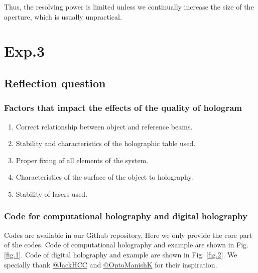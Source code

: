 \documentclass[12pt,a4paper,UTF8]{article}
\begin{document}
        Thus, the resolving power is limited unless we continually increase the size of the aperture, which is usually unpractical.



\section{Exp.3 }
    \subsection{Reflection question}
        \subsubsection{Factors that impact the effects of the quality of hologram}
        \begin{enumerate}[label=\arabic*.]
            \item Correct relationship between object and reference beams.        
            \item Stability and characteristics of the holographic table used.
            \item Proper fixing of all elements of the system.
            \item Characteristics of the surface of the object to holography.
            \item Stability of lasers used.
        \end{enumerate}
        
        \subsubsection{Code for computational holography and digital holography}
        Codes are available in our Github repository. Here we only provide the core part of the codes.
        Code of computational holography and example are shown in Fig. \ref{fig.1}. 
        Code of digital holography and example are shown in Fig. \ref{fig.2}.
        We specially thank \href{https://github.com/JackHCC/Computer-Generated-Hologram}{@JackHCC} and 
        \href{https://github.com/OptoManishK/Digital_Holography}{@OptoManishK} for their inspiration.
\end{document}
